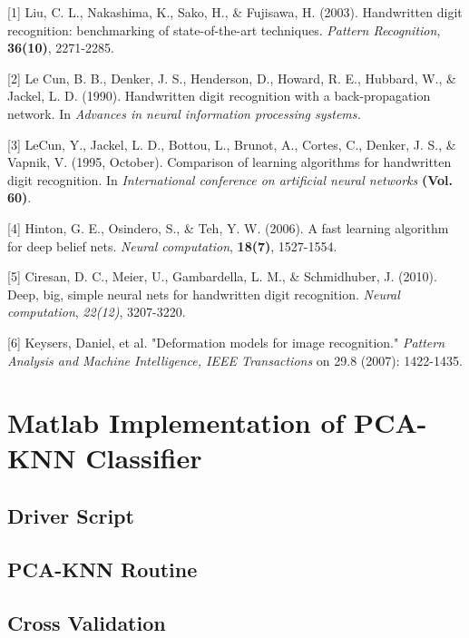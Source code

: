 \documentclass{article} %
\begin{document}
\small{
[1] Liu, C. L., Nakashima, K., Sako, H., \& Fujisawa, H. (2003). Handwritten
digit recognition: benchmarking of state-of-the-art techniques. {\it Pattern
    Recognition}, {\bf 36(10)}, 2271-2285.

[2] Le Cun, B. B., Denker, J. S., Henderson, D., Howard, R. E., Hubbard, W., \&
Jackel, L. D. (1990). Handwritten digit recognition with a back-propagation
network. In {\it Advances in neural information processing systems.}

[3] LeCun, Y., Jackel, L. D., Bottou, L., Brunot, A., Cortes, C., Denker, J.
S., \& Vapnik, V. (1995, October). Comparison of learning algorithms for
handwritten digit recognition. In {\it International conference on artificial
    neural networks} {\bf (Vol. 60)}.

[4] Hinton, G. E., Osindero, S., \& Teh, Y. W. (2006). A fast learning
algorithm for deep belief nets. {\it Neural computation}, {\bf 18(7)}, 1527-1554.

[5] Ciresan, D. C., Meier, U., Gambardella, L. M., \& Schmidhuber, J. (2010).
Deep, big, simple neural nets for handwritten digit recognition. {\it Neural
    computation}, {\it 22(12)}, 3207-3220.

[6] Keysers, Daniel, et al. "Deformation models for image recognition."
{\it Pattern Analysis and Machine Intelligence, IEEE Transactions} on 29.8 (2007):
1422-1435.
}

\newpage
\appendix
\section{Matlab Implementation of PCA-KNN Classifier}
\subsection{Driver Script}

\subsection{PCA-KNN Routine}

\subsection{Cross Validation}

\newpage
\end{document}
